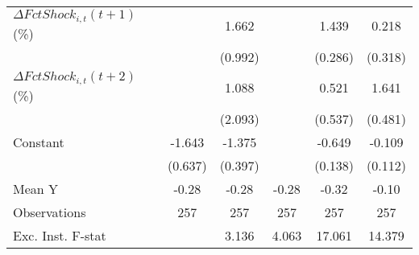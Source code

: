 {\begin{tabular}{l*{5}{c}}
\addlinespace
$ \Delta FctShock_{i,t}(t+1)$ (\%)&                     &       1.662         &                     &       1.439\sym{***}&       0.218         \\
                    &                     &     (0.992)         &                     &     (0.286)         &     (0.318)         \\
\addlinespace
$ \Delta FctShock_{i,t}(t+2)$ (\%)&                     &       1.088         &                     &       0.521         &       1.641\sym{***}\\
                    &                     &     (2.093)         &                     &     (0.537)         &     (0.481)         \\
\addlinespace
Constant            &      -1.643\sym{**} &      -1.375\sym{***}&                     &      -0.649\sym{***}&      -0.109         \\
                    &     (0.637)         &     (0.397)         &                     &     (0.138)         &     (0.112)         \\
\midrule
Mean Y              &       -0.28         &       -0.28         &       -0.28         &       -0.32         &       -0.10         \\
Observations        &         257         &         257         &         257         &         257         &         257         \\
Exc. Inst. F-stat   &                     &       3.136         &       4.063         &      17.061         &      14.379         \\
\bottomrule
\end{tabular}
}
